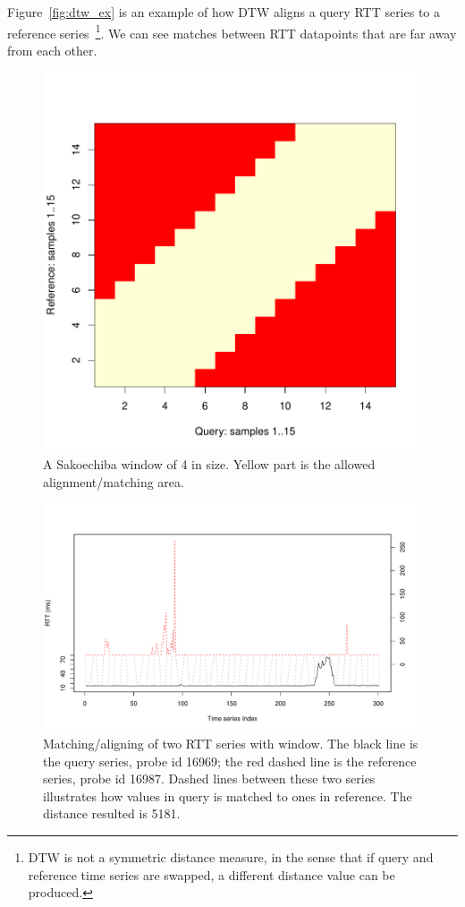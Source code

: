 Figure~\ref{fig:dtw_ex} is an example of how \ac{DTW} aligns a query RTT series to a reference series~\footnote{\ac{DTW} is not a symmetric distance measure, in the sense that if query and reference time series are swapped, a different distance value can be produced.}. 
We can see matches between RTT datapoints that are far away from each other. 

\begin{figure}[!htb]
\centering
\includegraphics[width=.5\textwidth]{gfx/chap3/win.pdf}
\caption{A Sakoechiba  window \cite{Sakoe1978} of 4 in size. Yellow part is the allowed alignment/matching area.}
\label{fig:win}
\end{figure}

\begin{figure}[!htb]
\centering
\includegraphics[width=.8\textwidth]{gfx/chap3/dtw_ex_win.pdf}
\caption{Matching/aligning of two RTT series with window. The black line is the query series, probe id 16969; the red dashed line is the reference series, probe id 16987. Dashed lines between these two series illustrates how values in query is matched to ones in reference. The distance resulted is 5181.}
\label{fig:dtw_ex_win}
\end{figure}

